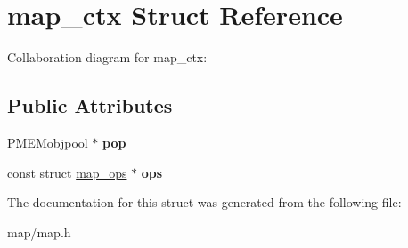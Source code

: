 \hypertarget{structmap__ctx}{}\section{map\+\_\+ctx Struct Reference}
\label{structmap__ctx}


Collaboration diagram for map\+\_\+ctx\+:
\subsection*{Public Attributes}
\begin{DoxyCompactItemize}
\item 
\mbox{\label{structmap__ctx_a73a1c7d35a65c852250a378accb7031f}} 
P\+M\+E\+Mobjpool $\ast$ {\bfseries pop}
\item 
\mbox{\label{structmap__ctx_a4ffd522f2667c8a07c8982d4b0d3c01a}} 
const struct \hyperlink{structmap__ops}{map\+\_\+ops} $\ast$ {\bfseries ops}
\end{DoxyCompactItemize}


The documentation for this struct was generated from the following file\+:\begin{DoxyCompactItemize}
\item 
map/map.\+h\end{DoxyCompactItemize}
